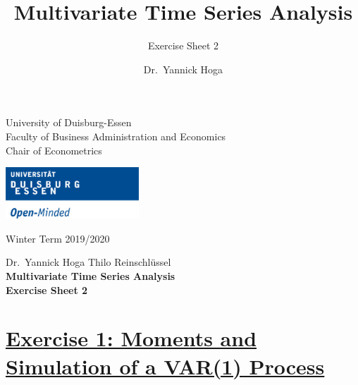 \documentclass[12pt,a4paper]{article}
\title{Multivariate Time Series Analysis}
\subtitle{Exercise Sheet 2}
\author{Dr.~Yannick Hoga}
\date{}
\newcommand{\tmpsection}[1]{}
\let\tmpsection=\section
\renewcommand{\section}[1]{\tmpsection{\underline{#1}} }
\begin{document}





\restoregeometry



\begin{minipage}{0.6\textwidth}
University of Duisburg-Essen\\
Faculty of Business Administration and Economics\\
Chair of Econometrics\\
\end{minipage}

	\begin{flushright}
	\vspace{-3cm}
	\includegraphics*[width=5cm]{Includes/duelogo_en.png}\\
	\vspace{.125cm}
	\end{flushright}
\hspace{-0.005cm}Winter Term 2019/2020

\vspace{0.05cm}

\begin{center}
	\vspace{.25cm}
	Dr.~Yannick Hoga \hspace{.5cm} Thilo Reinschlüssel \\
	\vspace{.25cm}
	\textbf{\Large{Multivariate Time Series Analysis}}\\
	\vspace{.25cm}
	\textbf{\large{Exercise Sheet 2}}\\
	\vspace{.125cm}
\end{center}





\hypertarget{exercise-1-moments-and-simulation-of-a-var1-process}{%
\section{Exercise 1: Moments and Simulation of a VAR(1)
Process}\label{exercise-1-moments-and-simulation-of-a-var1-process}}
\end{document}
